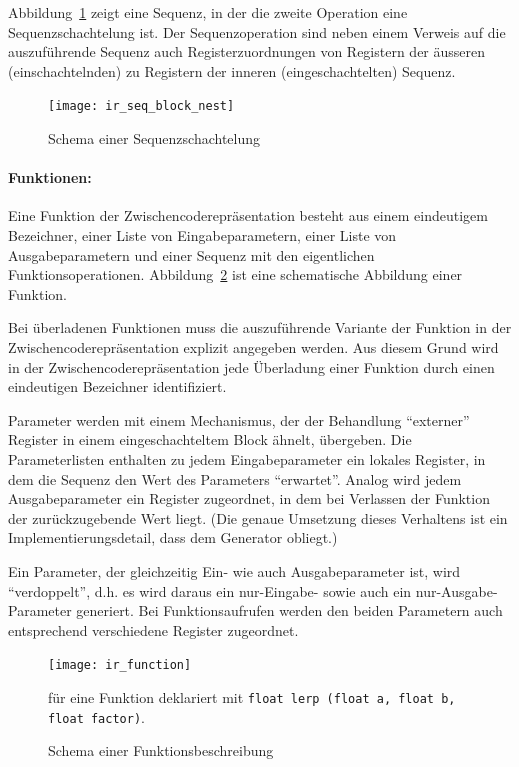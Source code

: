 \documentclass[twoside,a4paper,fleqn,12pt]{book}
\begin{document}
Abbildung~\ref{fig:ir_seq_block_nest} zeigt eine Sequenz, in der die zweite Operation eine Sequenzschachtelung ist.
Der Sequenzoperation sind neben einem Verweis auf die auszuführende Sequenz auch Registerzuordnungen von
Registern der äusseren (einschachtelnden) zu Registern der inneren (eingeschachtelten) Sequenz.

\begin{figure}[h]
   \centering
  \texttt{[image: ir\_seq\_block\_nest]}
  \caption{Schema einer Sequenzschachtelung}
  \label{fig:ir_seq_block_nest}
\end{figure}

\paragraph{Funktionen:}
Eine Funktion der Zwischencoderepräsentation besteht aus einem eindeutigem Bezeichner, einer Liste von Eingabeparametern,
einer Liste von Ausgabeparametern und einer Sequenz mit den eigentlichen Funktionsoperationen. Abbildung~\ref{fig:ir_function}
ist eine schematische Abbildung einer Funktion.

Bei überladenen Funktionen muss die auszuführende Variante der Funktion in der Zwischencoderepräsentation
explizit angegeben werden.
Aus diesem Grund wird in der Zwischencoderepräsentation jede Überladung einer Funktion durch einen eindeutigen Bezeichner identifiziert.

Parameter werden mit einem Mechanismus, der der Behandlung "`externer"' Register in einem eingeschachteltem
Block ähnelt, übergeben. Die Parameterlisten enthalten zu jedem Eingabeparameter ein lokales Register, in dem die
Sequenz den Wert des Parameters "`erwartet"'. Analog wird jedem Ausgabeparameter ein Register zugeordnet,
in dem bei Verlassen der Funktion der zurückzugebende Wert liegt.
(Die genaue Umsetzung dieses Verhaltens ist ein Implementierungsdetail, dass dem Generator obliegt.)

Ein Parameter, der gleichzeitig Ein- wie auch Ausgabeparameter ist, wird "`verdoppelt"', d.h. es wird daraus
ein nur-Eingabe- sowie auch ein nur-Ausgabe-Parameter generiert. Bei Funktionsaufrufen werden den beiden
Parametern auch entsprechend verschiedene Register zugeordnet.

\begin{figure}[h]
   \centering
  \texttt{[image: ir\_function]}
  \caption{Schema einer Funktionsbeschreibung}
  {\small für eine Funktion deklariert mit \texttt{float lerp (float a, float b, float factor)}.}
  \label{fig:ir_function}
\end{figure}
\end{document}

